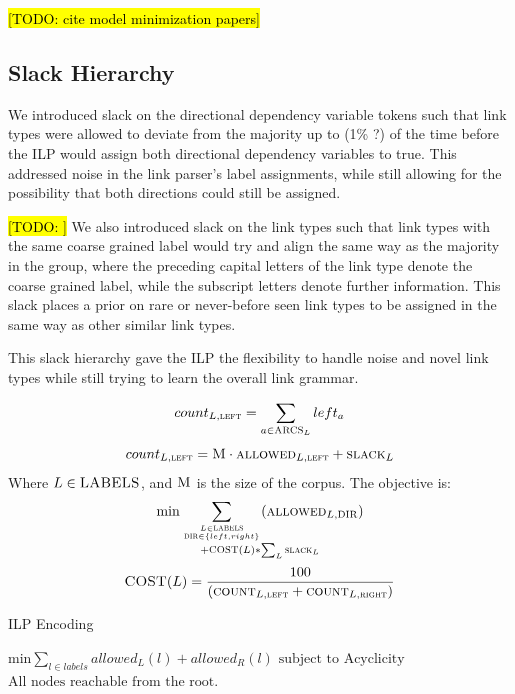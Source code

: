 \documentclass[11pt]{article}
\newcommand{\Note}[1]{}
\renewcommand{\Note}[1]{\hl{[#1]}}  %
\newcommand{\TODO}[1]{\Note{TODO: #1}}
\begin{document}
\TODO{cite model minimization papers}


\subsection{Slack Hierarchy}

We introduced slack on the directional dependency variable tokens such that link types were allowed to deviate from the majority up to (1\% ?) of the time before the ILP would assign both directional dependency variables to true. This addressed noise in the link parser's label assignments, while still allowing for the possibility that both directions could still be assigned.

\TODO{} We also introduced slack on the link types such that link types with the same coarse grained label would try and align the same way as the majority in the group, where the preceding capital letters of the link type denote the coarse grained label, while the subscript letters denote further information. This slack places a prior on rare or never-before seen link types to be assigned in the same way as other similar link types.

This slack hierarchy gave the ILP the flexibility to handle noise and novel link types while still trying to learn the overall link grammar.


\begin{equation}
  count_{L, \textsc{left}} = \sum_{a \in \textsc{ARCS}_L} left_a
\end{equation}
\begin{equation}
  count_{L, \textsc{left}} = \textsc{M} \cdot \textsc{allowed}_{L,\textsc{left}} + \textsc{slack}_{L}
\end{equation}
Where $L \in \textsc{LABELS}$, and $\textsc{M}$ is the size of the corpus.
The objective is:
\begin{equation}
  \min \sum_{L \in \textsc{LABELS} \atop \textsc{DIR} \in \{left, right\}} (\textsc{allowed}_{L,\textsc{DIR}}) \atop + \textsc{COST}(L) * \sum_L \textsc{slack}_L
\end{equation}
\begin{equation}
  \textsc{COST}(L) = \frac{100}{(\textsc{count}_{L,\textsc{left}} + \textsc{count}_{L,\textsc{right}})}
\end{equation}


\begin{algorithm}
\caption{ILP Encoding}\label{ILP}
\begin{algorithmic}[1]

\State $\text{min} \sum_{l \in labels} allowed_L(l) + allowed_R(l)$
\State $\text{subject to}$
\State $\text{Acyclicity}$
\State $\text{All nodes reachable from the root.}$

\end{algorithmic}
\end{algorithm}
\end{document}
